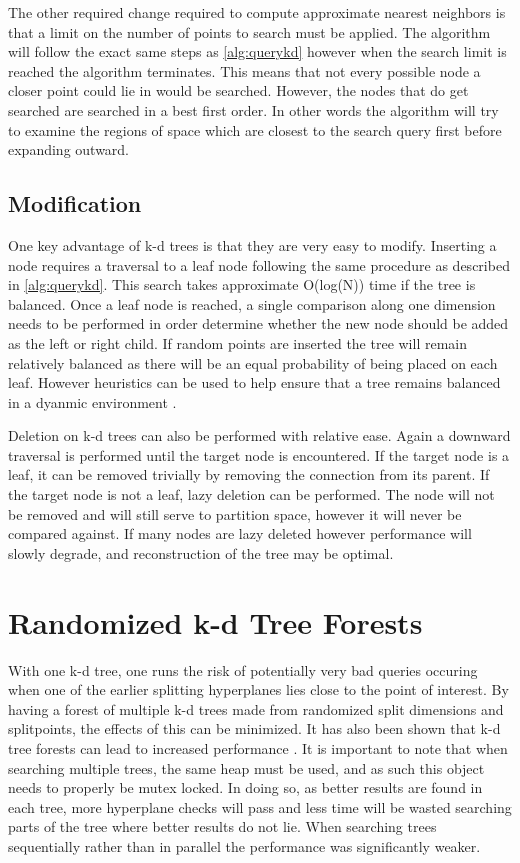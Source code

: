The other required change required to compute approximate nearest neighbors is that a limit on the number of points to search must be applied.  The algorithm will follow the exact same steps as \ref{alg:querykd} however when the search limit is reached the algorithm terminates.  This means that not every possible node a closer point could lie in would be searched.  However, the nodes that do get searched are searched in a best first order.  In other words the algorithm will try to examine the regions of space which are closest to the search query first before expanding outward.

\subsection{Modification}

One key advantage of k-d trees is that they are very easy to modify.  Inserting a node requires a traversal to a leaf node following the same procedure as described in \ref{alg:querykd}.  This search takes approximate O(log(N)) time if the tree is balanced.  Once a leaf node is reached, a single comparison along one dimension needs to be performed in order determine whether the new node should be added as the left or right child.  If random points are inserted the tree will remain relatively balanced as there will be an equal probability of being placed on each leaf.  However heuristics can be used to help ensure that a tree remains balanced in a dyanmic environment \citep{hunt2006fast}.

Deletion on k-d trees can also be performed with relative ease.  Again a downward traversal is performed until the target node is encountered. If the target node is a leaf, it can be removed trivially by removing the connection from its parent.  If the target node is not a leaf, lazy deletion can be performed.  The node will not be removed and will still serve to partition space, however it will never be compared against.  If many nodes are lazy deleted however performance will slowly degrade, and reconstruction of the tree may be optimal.

\section{Randomized k-d Tree Forests}

With one k-d tree, one runs the risk of potentially very bad queries occuring when one of the earlier splitting hyperplanes lies close to the point of interest.  By having a forest of multiple k-d trees made from randomized split dimensions and splitpoints, the effects of this can be minimized.  It has also been shown that k-d tree forests can lead to increased performance \citep{silpa2008optimised}.  It is important to note that when searching multiple trees, the same heap must be used, and as such this object needs to properly be mutex locked.  In doing so, as better results are found in each tree, more hyperplane checks will pass and less time will be wasted searching parts of the tree where better results do not lie.  When searching trees sequentially rather than in parallel the performance was significantly weaker.

